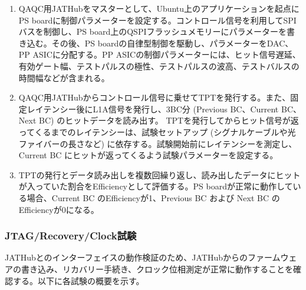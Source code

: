 \begin{enumerate}
    \item QAQC用JATHubをマスターとして、Ubuntu上のアプリケーションを起点にPS boardに制御パラメーターを設定する。コントロール信号を利用してSPIバスを制御し、PS board上のQSPIフラッシュメモリーにパラメーターを書き込む。その後、PS boardの自律型制御を駆動し、パラメーターをDAC、PP ASICに分配する。PP ASICの制御パラメーターには、ヒット信号遅延、有効ゲート幅、テストパルスの極性、テストパルスの波高、テストバルスの時間幅などが含まれる。
    \baselineskip

    \item QAQC用JATHubからコントロール信号に乗せてTPTを発行する。また、固定レイテンシー後にL1A信号を発行し、3BC分 (Previous BC、Current BC、Next BC) のヒットデータを読み出す。
    TPTを発行してからヒット信号が返ってくるまでのレイテンシーは、試験セットアップ (シグナルケーブルや光ファイバーの長さなど) に依存する。試験開始前にレイテンシーを測定し、Current BC にヒットが返ってくるよう試験パラメーターを設定する。
    \baselineskip

    \item TPTの発行とデータ読み出しを複数回繰り返し、読み出したデータにヒットが入っていた割合をEfficiencyとして評価する。PS boardが正常に動作している場合、Current BC のEfficiencyが1、Previous BC および Next BC のEfficiencyが0になる。
    \baselineskip

\end{enumerate}



\subsubsection{JTAG/Recovery/Clock試験}
\baselineskip
\label{subsubsec_jtag}
JATHubとのインターフェイスの動作検証のため、JATHubからのファームウェアの書き込み、リカバリー手続き、クロック位相測定が正常に動作することを確認する。以下に各試験の概要を示す。

